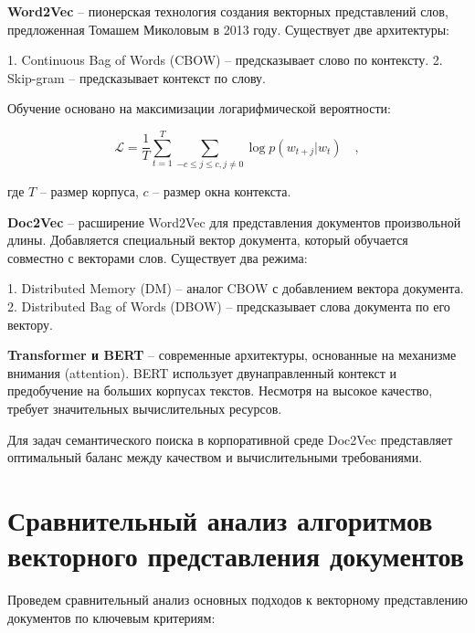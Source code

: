 	\textbf{Word2Vec} – пионерская технология создания векторных представлений слов, предложенная Томашем Миколовым в 2013 году. Существует две архитектуры:
	
	1. Continuous Bag of Words (CBOW) – предсказывает слово по контексту.
	2. Skip-gram – предсказывает контекст по слову.
	
	Обучение основано на максимизации логарифмической вероятности:
	
	\begin{equation}
		\mathcal{L} = \frac{1}{T}\sum_{t=1}^{T}\sum_{-c \leq j \leq c, j \neq 0} \log p(w_{t+j}|w_t)  \quad,
	\end{equation}
	
	\noindent где $T$ – размер корпуса, $c$ – размер окна контекста.
	
	\textbf{Doc2Vec} – расширение Word2Vec для представления документов произвольной длины. Добавляется специальный вектор документа, который обучается совместно с векторами слов. Существует два режима:
	
	1. Distributed Memory (DM) – аналог CBOW с добавлением вектора документа.
	2. Distributed Bag of Words (DBOW) – предсказывает слова документа по его вектору.
	
	\textbf{Transformer и BERT} – современные архитектуры, основанные на механизме внимания (attention). BERT использует двунаправленный контекст и предобучение на больших корпусах текстов. Несмотря на высокое качество, требует значительных вычислительных ресурсов.
	
	Для задач семантического поиска в корпоративной среде Doc2Vec представляет оптимальный баланс между качеством и вычислительными требованиями.
	
	\section{Сравнительный анализ алгоритмов векторного представления документов}
	
	Проведем сравнительный анализ основных подходов к векторному представлению документов по ключевым критериям:
	
